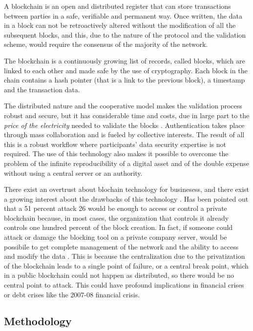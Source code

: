 \documentclass[]{book}
\begin{document}
A blockchain is an open and distributed register that can store
transactions between parties in a safe, verifiable and permanent way.
Once written, the data in a block can not be retroactively altered
without the modification of all the subsequent blocks, and this, due to
the nature of the protocol and the validation scheme, would require the
consensus of the majority of the network. \citep{iansiti2017truth}

The blockchain is a continuously growing list of records, called blocks,
which are linked to each other and made safe by the use of cryptography.
Each block in the chain contains a hash pointer (that is a link to the
previous block), a timestamp and the transaction data.

The distributed nature and the cooperative model makes the validation
process robust and secure, but it has considerable time and costs, due
in large part to the \emph{price of the electricity} needed to validate
the blocks \citep{underwood2016blockchain}. Authentication takes place
through mass collaboration and is fueled by collective interests. The
result of all this is a robust workflow where participants' data
security expertise is not required. The use of this technology also
makes it possible to overcome the problem of the infinite
reproducibility of a digital asset and of the double expense without
using a central server or an authority. \citep{karame2012double}

There exist an overtrust about blochain technology for businesess, and
there exist a growing interest about the drawbacks of this technology
\citep[\citet{lin2017survey}, \citet{yli2016current}]{eyal2018majority}.
Has been pointed out that a 51 percent attack 26 would be enough to
access or control a private blockchain because, in most cases, the
organization that controls it already controls one hundred percent of
the block creation. In fact, if someone could attack or damage the
blocking tool on a private company server, would be possibile to get
complete management of the network and the ability to access and modify
the data \citep{hampton2016understanding}. This is because the
centralization due to the privatization of the blockchain leads to a
single point of failure, or a central break point, which in a public
blockchain could not happen as distributed, so there would be no central
point to attack. This could have profound implications in financial
crises or debt crises like the 2007-08 financial crisis.

\subsection{Methodology}\label{methodology-4}
\end{document}
